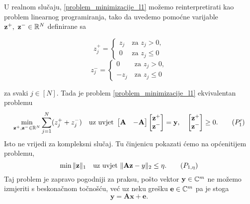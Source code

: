 \documentclass[a4paper,twoside,12pt]{memoir} %
\newcommand{\vect}[1]{\mathbf{#1}}
\renewcommand{\vec}{\vect}
\newcommand{\norm}[1]{\|{#1}\|}
\begin{document}
\indent
U realnom slu\v{c}aju, \eqref{problem_minimizacije_l1} mo\v{z}emo reinterpretirati kao problem linearnog programiranja, tako da uvedemo pomo\'cne varijable $\vec z^+,\ \vec z^- \in \R^N$ definirane sa
\begin{multicols}{2}
    \noindent
    \begin{equation*} 
        z_j^+ = 
        \begin{cases}
            z_j\ & \text{za } z_j > 0, \\
            0\ & \text{za } z_j \leq 0
        \end{cases}
    \end{equation*}
    \begin{equation*} 
        z_j^- = 
        \begin{cases}
            0\ & \text{za } z_j > 0, \\
            -z_j\ & \text{za } z_j \leq 0
        \end{cases}
    \end{equation*}
\end{multicols}
\noindent
za svaki $j \in [N]$. Tada je problem \eqref{problem_minimizacije_l1} ekvivalentan problemu
\begin{equation}
    \min_{\vec z^+,\vec z^- \\ \in \R^N} \sum_{j=1}^{N}(z_j^+ + z_j^-) \quad \text{uz uvjet }
    \begin{bmatrix*}
        \vec A & -\vec A
    \end{bmatrix*}
    \begin{bmatrix*}
        \vec z^+ \\ \vec z^-
    \end{bmatrix*}
    = \vec y, \quad
    \begin{bmatrix*}
        \vec z^+ \\ \vec z^-
    \end{bmatrix*}
    \geq 0.\tag{$P_1'$}
\end{equation}
Isto ne vrijedi za kompleksni slu\v{c}aj. Tu \v{c}injenicu pokazati \'cemo na op\'{c}enitijem problemu,
\begin{equation}\label{problem_minimizacije_l1_kvadraticni}
    \min \norm{\vec z}_1 \quad \text{uz uvjet } \norm{\vec{Az}-y}_2 \leq \eta.\tag{$P_{1,\eta}$}
\end{equation}
Taj problem je zapravo pogodniji za praksu, po\v{s}to vektor $\vec y \in \C^m$ ne mo\v{z}emo izmjeriti s beskona\v{c}nom to\v{c}no\v{s}\'cu, ve\'c uz neku gre\v{s}ku $\vec e \in \C^m$ pa je stoga
\begin{equation*}
    \vec y = \vec{Ax} + \vec e. 
\end{equation*}
\end{document}
